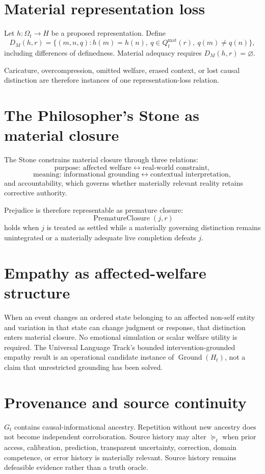 \documentclass[11pt]{article}
\begin{document}
\section{Material representation loss}
Let $h:\Omega_t\to H$ be a proposed representation. Define
\[
D_M(h,r)=\{(m,n,q):h(m)=h(n),\ q\in Q^{\mathrm{mat}}_t(r),\ q(m)\neq q(n)\},
\]
including differences of definedness. Material adequacy requires $D_M(h,r)=\varnothing$.

Caricature, overcompression, omitted welfare, erased context, or lost causal distinction are therefore instances of one representation-loss relation.

\section{The Philosopher's Stone as material closure}
The Stone constrains material closure through three relations:
\[
\text{purpose: affected welfare}\leftrightarrow\text{real-world constraint},
\]
\[
\text{meaning: informational grounding}\leftrightarrow\text{contextual interpretation},
\]
and accountability, which governs whether materially relevant reality retains corrective authority.

Prejudice is therefore representable as premature closure:
\[
\operatorname{PrematureClosure}(j,r)
\]
holds when $j$ is treated as settled while a materially governing distinction remains unintegrated or a materially adequate live completion defeats $j$.

\section{Empathy as affected-welfare structure}
When an event changes an ordered state belonging to an affected non-self entity and variation in that state can change judgment or response, that distinction enters material closure. No emotional simulation or scalar welfare utility is required. The Universal Language Track's bounded intervention-grounded empathy result is an operational candidate instance of $\operatorname{Ground}(H_t)$, not a claim that unrestricted grounding has been solved.

\section{Provenance and source continuity}
$G_t$ contains causal-informational ancestry. Repetition without new ancestry does not become independent corroboration. Source history may alter $\succeq_t$ when prior access, calibration, prediction, transparent uncertainty, correction, domain competence, or error history is materially relevant. Source history remains defeasible evidence rather than a truth oracle.
\end{document}
